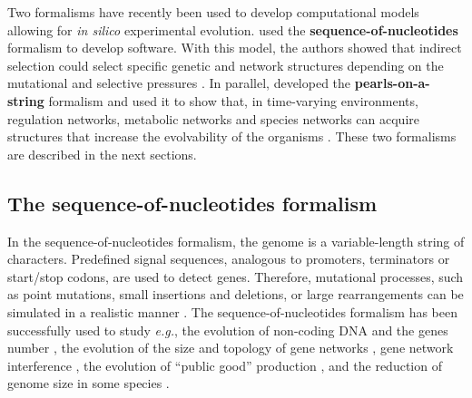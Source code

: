 Two formalisms have recently been used to develop computational models allowing for \textit{in silico} experimental evolution. \cite{knibbe-et-al-2007a,knibbe-et-al-2007b} used the \textbf{sequence-of-nucleotides} formalism to develop {\aevol} software. With this model, the authors showed that indirect selection could select specific genetic and network structures depending on the mutational and selective pressures \citep{knibbe-et-al-2007b,beslon-et-al-2010a,beslon-et-al-2010b}. In parallel, \cite{crombach-hogeweg-2008} developed the \textbf{pearls-on-a-string} formalism and used it to show that, in time-varying environments, regulation networks, metabolic networks and species networks can acquire structures that increase the evolvability of the organisms \citep{crombach-hogeweg-2007,crombach-hogeweg-2008,crombach-hogeweg-2009}. These two formalisms are described in the next sections.


\subsection{The sequence-of-nucleotides formalism}
In the sequence-of-nucleotides formalism, the genome is a variable-length string of characters. Predefined signal sequences, analogous to promoters, terminators or start/stop codons, are used to detect genes. Therefore, mutational processes, such as point mutations, small insertions and deletions, or large rearrangements can be simulated in a realistic manner \citep{hindre-et-al-2012}. The sequence-of-nucleotides formalism has been successfully used to study \textit{e.g.}, the evolution of non-coding DNA and the genes number \citep{knibbe-et-al-2007b}, the evolution of the size and topology of gene networks \citep{kuo-et-al-2006,beslon-et-al-2010a}, gene network interference \citep{mattiussi-floreano-2007,marbach-et-al-2009}, the evolution of ``public good'' production \citep{frenoy-et-al-2013}, and the reduction of genome size in some species \citep{batut-et-al-2013}.

